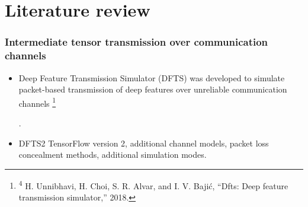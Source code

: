 \documentclass[aspectratio=169]{beamer}
\newcommand\blfootnote[1]{%
	\begingroup
	\renewcommand\thefootnote{}\footnote{#1}%
	\addtocounter{footnote}{-1}%
	\endgroup
}
\begin{document}

\section{Literature review}

\begin{frame}
\frametitle{Intermediate tensor transmission over communication channels}
	\begin{itemize}
	\item Deep Feature Transmission Simulator (DFTS) was developed to simulate packet-based transmission of deep features over unreliable communication channels \blfootnote{\tiny \textsuperscript{4} H. Unnibhavi, H. Choi, S. R. Alvar, and I. V. Bajić, “Dfts: Deep feature transmission simulator,” 2018.} \cite{unnibhavi2018dfts}.
		\item DFTS2 TensorFlow version 2, additional channel models, packet loss concealment methods, additional simulation modes.
	\end{itemize}
\end{frame}
\end{document}
